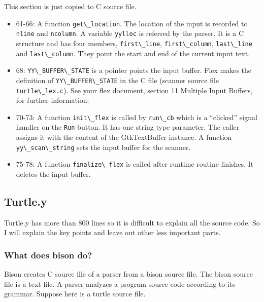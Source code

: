 This section is just copied to C source file.

\begin{itemize}
\tightlist
\item
  61-66: A function \passthrough{\lstinline!get\_location!}. The
  location of the input is recorded to \passthrough{\lstinline!nline!}
  and \passthrough{\lstinline!ncolumn!}. A variable
  \passthrough{\lstinline!yylloc!} is referred by the parser. It is a C
  structure and has four members, \passthrough{\lstinline!first\_line!},
  \passthrough{\lstinline!first\_column!},
  \passthrough{\lstinline!last\_line!} and
  \passthrough{\lstinline!last\_column!}. They point the start and end
  of the current input text.
\item
  68: \passthrough{\lstinline!YY\_BUFFER\_STATE!} is a pointer points
  the input buffer. Flex makes the definition of
  \passthrough{\lstinline!YY\_BUFFER\_STATE!} in the C file (scanner
  source file \passthrough{\lstinline!turtle\_lex.c!}). See your flex
  document, section 11 Multiple Input Buffers, for further information.
\item
  70-73: A function \passthrough{\lstinline!init\_flex!} is called by
  \passthrough{\lstinline!run\_cb!} which is a ``clicked'' signal
  handler on the \passthrough{\lstinline!Run!} button. It has one string
  type parameter. The caller assigns it with the content of the
  GtkTextBuffer instance. A function
  \passthrough{\lstinline!yy\_scan\_string!} sets the input buffer for
  the scanner.
\item
  75-78: A function \passthrough{\lstinline!finalize\_flex!} is called
  after runtime routine finishes. It deletes the input buffer.
\end{itemize}

\subsection{Turtle.y}\label{turtle.y}

Turtle.y has more than 800 lines so it is difficult to explain all the
source code. So I will explain the key points and leave out other less
important parts.

\subsubsection{What does bison do?}\label{what-does-bison-do}

Bison creates C source file of a parser from a bison source file. The
bison source file is a text file. A parser analyzes a program source
code according to its grammar. Suppose here is a turtle source file.

